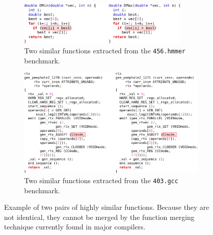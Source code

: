 \begin{figure}[h]
\centering
\begin{subfigure}{\textwidth}
\centering
\includegraphics[width=0.9\textwidth]{src/relatedwork/figs/example-similar-1-hmmer}
\caption{Two similar functions extracted from the \texttt{456.hmmer} benchmark.}
\label{fig:example-similar-1-hmmer}
\end{subfigure}
\begin{subfigure}{\textwidth}
\centering
\includegraphics[width=\textwidth]{src/relatedwork/figs/example-similar-3-gcc}
\caption{Two similar functions extracted from the \texttt{403.gcc} benchmark.}
\label{fig:example-similar-3-gcc}
\end{subfigure}
\caption{Example of two pairs of highly similar functions. Because they are not identical, they cannot be merged by the function merging technique currently found in major compilers.}
\label{fig:example-similar}
\end{figure}




